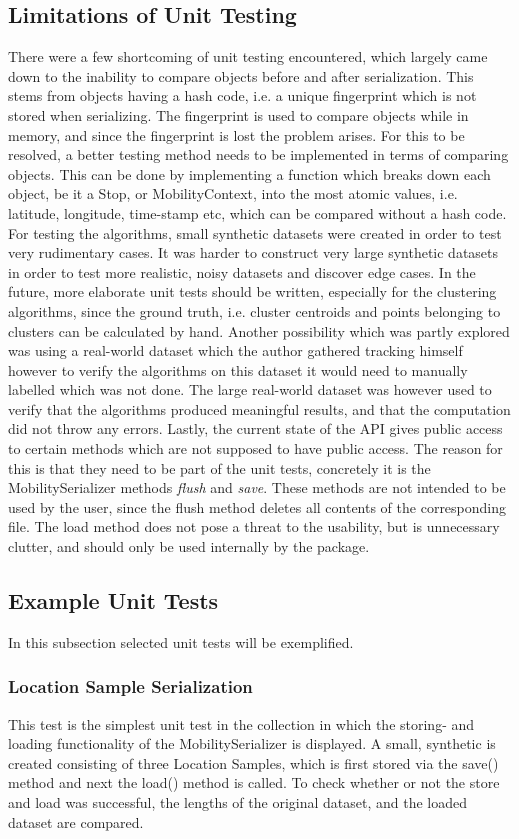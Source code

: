 \subsection{Limitations of Unit Testing}
There were a few shortcoming of unit testing encountered, which largely came down to the inability to compare objects before and after serialization. This stems from objects having a hash code, i.e. a unique fingerprint which is not stored when serializing. The fingerprint is used to compare objects while in memory, and since the fingerprint is lost the problem arises. For this to be resolved, a better testing method needs to be implemented in terms of comparing objects. This can be done by implementing a function which breaks down each object, be it a Stop, or MobilityContext, into the most atomic values, i.e. latitude, longitude, time-stamp etc, which can be compared without a hash code. For testing the algorithms, small synthetic datasets were created in order to test very rudimentary cases. It was harder to construct very large synthetic datasets in order to test more realistic, noisy datasets and discover edge cases. In the future, more elaborate unit tests should be written, especially for the clustering algorithms, since the ground truth, i.e. cluster centroids and points belonging to clusters can be calculated by hand. Another possibility which was partly explored was using a real-world dataset which the author gathered tracking himself however to verify the algorithms on this dataset it would need to manually labelled which was not done. The large real-world dataset was however used to verify that the algorithms produced meaningful results, and that the computation did not throw any errors. Lastly, the current state of the API gives public access to certain methods which are not supposed to have public access. The reason for this is that they need to be part of the unit tests, concretely it is the MobilitySerializer methods \textit{flush} and \textit{save}. These methods are not intended to be used by the user, since the flush method deletes all contents of the corresponding file. The load method does not pose a threat to the usability, but is unnecessary clutter, and should only be used internally by the package. 

\subsection{Example Unit Tests}
In this subsection selected unit tests will be exemplified.

\subsubsection*{Location Sample Serialization}
This test is the simplest unit test in the collection in which the storing- and loading functionality of the MobilitySerializer is displayed. A small, synthetic is created consisting of three Location Samples, which is first stored via the save() method and next the load() method is called. To check whether or not the store and load was successful, the lengths of the original dataset, and the loaded dataset are compared. 

